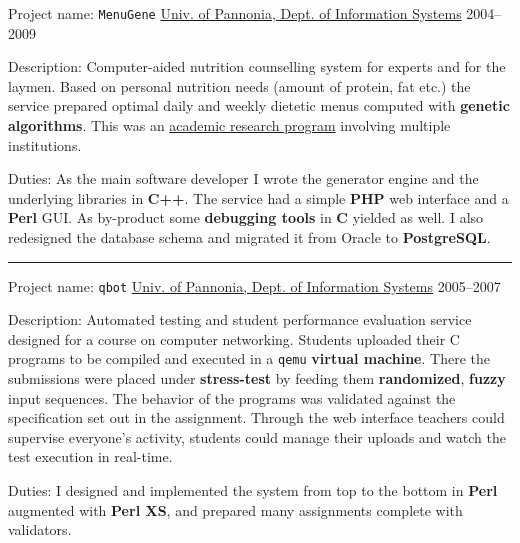 \documentclass[a4paper,12pt]{article}
\newcommand\Yell{\textbf}
\newcommand\Label{\textsf}
\newcommand{\midline}{\rule[0.5ex]{\linewidth-\parindent}{.5pt}}
\begin{document}
\Label{Project name}: \texttt{MenuGene}\hfill
\href{http://virt.uni-pannon.hu/index.php/about-the-department}%
{Univ. of Pannonia, Dept. of Information Systems}
\Label{2004--2009}\par\medskip
\Label{Description}: Computer-aided nutrition counselling system for experts
and for the laymen.  Based on personal nutrition needs (amount of protein,
fat etc.) the service prepared optimal daily and weekly dietetic menus
computed with \Yell{genetic algorithms}.  This was an
\href{http://github.com/enadam/thesis/raw/master/thesis.pdf}%
{academic research program} involving multiple institutions.\par\medskip
\Label{Duties}: As the main software developer I wrote the generator engine
and the underlying libraries in \Yell{C++}.  The service had a simple
\Yell{PHP} web interface and a \Yell{Perl} GUI.  As by-product some
\Yell{debugging tools} in \Yell{C} yielded as well.  I also redesigned
the database schema and migrated it from Oracle to \Yell{PostgreSQL}.

\midline\par
\Label{Project name}: \texttt{qbot}\hfill
\href{http://virt.uni-pannon.hu/index.php/about-the-department}%
{Univ. of Pannonia, Dept. of Information Systems}
\Label{2005--2007}\par\medskip
\Label{Description}: Automated testing and student performance evaluation
service designed for a course on computer networking.  Students uploaded
their C programs to be compiled and executed in a \texttt{qemu} \Yell{virtual
machine}.  There the submissions were placed under \Yell{stress-test} by
feeding them \Yell{randomized}, \Yell{fuzzy} input sequences.  The behavior
of the programs was validated against the specification set out in the
assignment.  Through the web interface teachers could supervise everyone's
activity, students could manage their uploads and watch the test execution
in real-time.
\par\medskip
\Label{Duties}: I designed and implemented the system from top to the bottom
in \Yell{Perl} augmented with \Yell{Perl XS}, and prepared many assignments
complete with validators.
\end{document}

